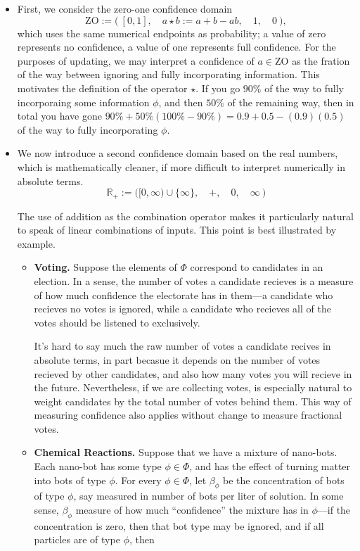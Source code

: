 \documentclass{uai2023}
\theoremstyle{plain}
\theoremstyle{definition}
\newcommand\ZO{\mathrm{ZO}}
\newcommand\Rplus{\mathbb R_+}
\begin{document}
\begin{itemize}
	\item
First, we consider the zero-one confidence domain
	\[
		\ZO := \Big(~ [0,1],
\quad a \star b :=
a + b - ab,
			\quad 1,
			\quad 0 ~\Big),
	\]
	which uses the same numerical endpoints as probability;
	a value of zero represents no confidence, a value of one represents full confidence.
	For the purposes of updating, we may interpret a confidence of $a \in \ZO$ as the fration of the way between ignoring and fully incorporating information.
	This motivates the definition of the operator $\star$.
	If you go $90\%$ of the way to fully incorporaing some information $\phi$, and then $50\%$ of the remaining way, then in total you have gone $90\% + 50\%(100\%-90\%) = 0.9 + 0.5 - (0.9)(0.5)$ of the way to fully incorporating $\phi$.

\item
We now introduce a second confidence domain based on the real numbers,
	which is mathematically cleaner, if
more difficult to interpret numerically in absolute terms.
	\[
		\Rplus :=
			\Big([0, \infty) \cup \{\infty\},
				\quad +,
				\quad 0,
				\quad \infty
				~\Big)
	\]

The use of addition as the combination operator makes it particularly natural to speak of linear combinations of inputs.
This point is best illustrated by example.

	\begin{itemize}
		\item \textbf{Voting.}
		Suppose the elements of $\Phi$ correspond to candidates in an election.
		In a sense, the number of votes a candidate recieves is a measure of how much confidence the electorate has in them---a candidate who recieves no votes is ignored, while a candidate who recieves all of the votes should be listened to exclusively.

		It's hard to say much  the raw number of votes a candidate recives in absolute terms, in part becasue it depends on the number of votes recieved by other candidates, and also how many votes you will recieve in the future.
Nevertheless, if we are collecting votes, is especially natural to weight candidates by the total number of votes behind them.
This way of measuring confidence also applies without change to measure fractional votes.

		\item \textbf{Chemical Reactions.}
		Suppose that we have a mixture of nano-bots.
		Each nano-bot has some type $\phi \in \Phi$, and has the effect of turning matter into bots of type $\phi$.
		For every $\phi \in \Phi$, let $\beta_\phi$ be the concentration of bots of type $\phi$, say measured in number of bots per liter of solution.
		In some sense, $\beta_\phi$ measure of how much ``confidence'' the mixture has in $\phi$---if the concentration is zero, then that bot type may be ignored, and if all particles are of type $\phi$, then


\end{itemize}
\end{itemize}
\end{document}
